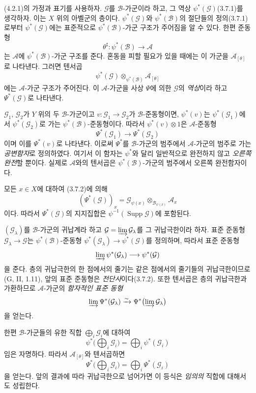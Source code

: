 \begin{env}[4.3.1]
\label{0.4.3.1-ko}
(4.2.1)의 가정과 표기를 사용하자. $\mathcal G$를 $\mathcal B$-가군이라
하고, 그 역상 $\psi^*(\mathcal G)$(3.7.1)를 생각하자. 이는 $X$ 위의
아벨군의 층이다. $\psi^*(\mathcal G)$와
$\psi^*(\mathcal B)$의 절단들의 정의(3.7.1)로부터
$\psi^*(\mathcal G)$에는 표준적으로 $\psi^*(\mathcal B)$-가군 구조가
주어짐을 알 수 있다. 한편 준동형
\[
  \theta^\sharp:\psi^*(\mathcal B)\longrightarrow\mathcal A
\]
는 $\mathcal A$에 $\psi^*(\mathcal B)$-가군 구조를 준다. 혼동을
피할 필요가 있을 때에는 이 가군을 $\mathcal A_{[\theta]}$로 나타낸다.
그러면 텐서곱
\[
  \psi^*(\mathcal G)
  \otimes_{\psi^*(\mathcal B)}\mathcal A_{[\theta]}
\]
에는 $\mathcal A$-가군 구조가 주어진다. 이 $\mathcal A$-가군을
사상 $\Psi$에 의한 $\mathcal G$의 \emph{역상}이라 하고
$\Psi^*(\mathcal G)$로 나타낸다.

$\mathcal G_1$, $\mathcal G_2$가 $Y$ 위의 두 $\mathcal B$-가군이고
$v:\mathcal G_1\to\mathcal G_2$가 $\mathcal B$-준동형이면,
$\psi^*(v)$는 $\psi^*(\mathcal G_1)$에서
$\psi^*(\mathcal G_2)$로 가는 $\psi^*(\mathcal B)$-준동형이다.
따라서 $\psi^*(v)\otimes1$은 $\mathcal A$-준동형
\[
  \Psi^*(\mathcal G_1)\longrightarrow\Psi^*(\mathcal G_2)
\]
이며 이를 $\Psi^*(v)$로 나타낸다. 이로써 $\Psi^*$를
$\mathcal B$-가군의 범주에서 $\mathcal A$-가군의 범주로 가는
\emph{공변함자}로 정의하였다. 여기서 이 함자는 $\psi^*$와 달리
일반적으로 완전하지 않고 \emph{오른쪽 완전}할 뿐이다. 실제로
$\mathcal A$와의 텐서곱은 $\psi^*(\mathcal B)$-가군의 범주에서
오른쪽 완전함자이다.

모든 $x\in X$에 대하여 (3.7.2)에 의해
\[
  (\Psi^*(\mathcal G))_x
  =\mathcal G_{\psi(x)}
   \otimes_{\mathcal B_{\psi(x)}}\mathcal A_x
\]
이다. 따라서 $\Psi^*(\mathcal G)$의 지지집합은
$\psi^{-1}(\operatorname{Supp}\mathcal G)$에 포함된다.
\end{env}

\begin{env}[4.3.2]
\label{0.4.3.2-ko}
$(\mathcal G_\lambda)$를 $\mathcal B$-가군의 귀납계라 하고
$\mathcal G=\varinjlim\mathcal G_\lambda$를 그 귀납극한이라 하자.
표준 준동형 $\mathcal G_\lambda\to\mathcal G$는
$\psi^*(\mathcal B)$-준동형
$\psi^*(\mathcal G_\lambda)\to\psi^*(\mathcal G)$를 정의하며,
따라서 표준 준동형
\[
  \varinjlim\psi^*(\mathcal G_\lambda)
  \longrightarrow
  \psi^*(\mathcal G)
\]
을 준다. 층의 귀납극한의 한 점에서의 줄기는 같은 점에서의 줄기들의
귀납극한이므로(G, II, 1.11), 앞의 표준 준동형은
\emph{전단사}이다(3.7.2). 또한 텐서곱은 층의 귀납극한과 가환하므로
$\mathcal A$-가군의 \emph{함자적인 표준 동형}
\[
  \varinjlim\Psi^*(\mathcal G_\lambda)
  \xrightarrow{\sim}
  \Psi^*\bigl(\varinjlim\mathcal G_\lambda\bigr)
\]
을 얻는다.

한편 $\mathcal B$-가군들의 유한 직합
$\bigoplus_i\mathcal G_i$에 대하여
\[
  \psi^*\bigl(\bigoplus_i\mathcal G_i\bigr)
  =\bigoplus_i\psi^*(\mathcal G_i)
\]
임은 자명하다. 따라서 $\mathcal A_{[\theta]}$와 텐서곱하면
\[
  \Psi^*\bigl(\bigoplus_i\mathcal G_i\bigr)
  =\bigoplus_i\Psi^*(\mathcal G_i)
  \tag{4.3.2.1}\label{0.4.3.2.1-ko}
\]
을 얻는다. 앞의 결과에 따라 귀납극한으로 넘어가면 이 등식은
\emph{임의의} 직합에 대해서도 성립한다.
\end{env}

